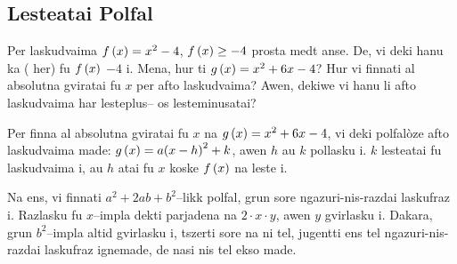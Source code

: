 \subsection{Lesteatai Polfal}
Per laskudvaima \(f \left(x\right) = x^2 - 4\), \(f\left(x\right) \geq - 4\) prosta medt anse. De, vi deki hanu
ka  ( her) fu \(f\left(x\right)\) \(-4\) i. Mena, hur ti
\(g \left(x\right) = x^2+6x-4\)? Hur vi finnati al absolutna gviratai fu \(x\) per afto laskudvaima?
Awen, dekiwe vi hanu li afto laskudvaima har lesteplus-- os lesteminusatai?

Per finna al absolutna gviratai fu \(x\) na \(g \left(x\right)=x^2+6x-4\), vi deki polfalòze afto
laskudvaima  made: \(g \left(x\right) = a{\left(x-h\right)}^2+k\), awen
\(h\) au \(k\) pollasku i. \(k\) lesteatai fu laskudvaima i, au \(h\) atai fu \(x\) koske \(f \left(x\right)\)
na leste i.

Na ens, vi finnati \(a^2 + 2ab + b^2\)--likk polfal, grun sore ngazuri-nis-razdai laskufraz i.
Razlasku fu \(x\)--impla dekti parjadena na \(2 \cdot x \cdot y\), awen \(y\) gvirlasku i.
Dakara, grun \(b^2\)--impla altid gvirlasku i, tszerti sore na ni tel, jugentti ens tel ngazuri-nis-razdai
laskufraz ignemade, de nasi nis tel ekso made.


